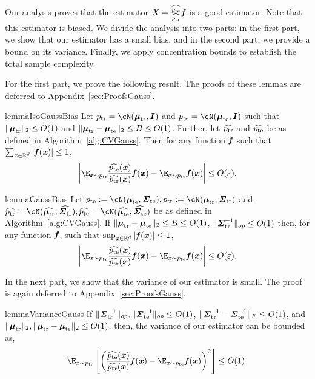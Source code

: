  Our analysis proves that the estimator $X = \frac{\widehat{p_{\mathrm{te}}}}{\widehat{p_{\mathrm{tr}}}}\boldsymbol{\mathit{f}}$ is a good estimator. Note that this estimator is biased. We divide the analysis into two parts: in the first part, we show that our estimator has a small bias, and in the second part, we provide a bound on its variance. Finally, we apply concentration bounds to establish the total sample complexity. 

 For the first part, we prove the following result. The proofs of these lemmas are deferred to Appendix~\ref{sec:ProofsGauss}.

 \begin{restatable}{lemma}{IsoGaussBias}
\label{lem:isotropic-gaussians-result}
Let $\ptr = \cN(\mtr,\II)$ and $\pte = \cN(\mte,\II)$ such that $\|\boldsymbol{\mathit{\mu}}_{\mathrm{tr}}\|_2\leq O(1)$ and $\|\boldsymbol{\mathit{\mu}}_{\mathrm{tr}}-\boldsymbol{\mathit{\mu}}_{\mathrm{te}}\|_2\leq B\leq O(1)$. Further, let $\widehat{p_{\mathrm{tr}}}$ and $\widehat{p_{\mathrm{te}}}$ be as defined in Algorithm~\ref{alg:CVGauss}. Then for any function $\boldsymbol{\mathit{f}}$ such that $\sum_{\boldsymbol{\mathit{x}}\in \mathbb{R}^d}|\boldsymbol{\mathit{f}}(\boldsymbol{\mathit{x}})|\leq 1$,
\[
\left|\E_{\xx\sim \ptr} \frac{\widehat{\pte}(\xx)}{\widehat{\ptr}(\xx)} \ff(\xx) - \E_{\xx \sim \pte} \ff(\xx)\right| \leq O(\varepsilon).
\]
\end{restatable}

\begin{restatable}{lemma}{GaussBias}
\label{lem:Q_gauss_non_iso}
    Let $\pte := \cN(\mte, \ste), \ptr := \cN(\mtr, \str)$ and $\widehat{\ptr} = \cN(\widehat{\mtr} , \widehat{\str}),\widehat{\pte} = \cN(\widehat{\mte} , \widehat{\ste})$ be as defined in Algorithm~\ref{alg:CVGauss}. If $\|\boldsymbol{\mathit{\mu}}_{\mathrm{tr}}-\boldsymbol{\mathit{\mu}}_{\mathrm{te}}\|_2 \leq B\leq O(1)$, $\|\boldsymbol{\mathit{\Sigma}}_{\mathrm{tr}}^{-1}\|_{op}\leq O(1)$ then, for any function $\boldsymbol{\mathit{f}}$, such that $\sup_{\boldsymbol{\mathit{x}}\in \mathbb{R}^d}|\boldsymbol{\mathit{f}}(\boldsymbol{\mathit{x}})|\leq 1$,
    \[
\left|\E_{\xx\sim \ptr} \frac{\widehat{\pte}(\xx)}{\widehat{\ptr}(\xx)} \ff(\xx) - \E_{\xx \sim \pte} \ff(\xx)\right| \leq O(\varepsilon).
\]
\end{restatable}

In the next part, we show that the variance of our estimator is small. The proof is again deferred to Appendix~\ref{sec:ProofsGauss}.

\begin{restatable}{lemma}{VarianceGauss}\label{lem:Var}
     If $\|\boldsymbol{\mathit{\Sigma}}_{\mathrm{tr}}^{-1}\|_{op}, \|\boldsymbol{\mathit{\Sigma}}_{\mathrm{te}}^{-1}\|_{op} \leq O(1)$, $\|\boldsymbol{\mathit{\Sigma}}_{\mathrm{tr}}^{-1}-\boldsymbol{\mathit{\Sigma}}_{\mathrm{te}}^{-1}\|_F\leq O(1)$, and $\|\boldsymbol{\mathit{\mu}}_{\mathrm{tr}}\|_2, \|\boldsymbol{\mathit{\mu}}_{\mathrm{tr}}-\boldsymbol{\mathit{\mu}}_{\mathrm{te}}\|_2\leq O(1)$, then, the variance of our estimator can be bounded as,
    \[
    \E_{\xx\sim \ptr} \left[\left(\frac{\widehat{\pte}(\xx)}{\widehat{\ptr}(\xx)}\ff(\xx) - \E_{\xx\sim\pte}\ff(\xx)\right)^2\right] \leq O(1).
    \]
\end{restatable}

